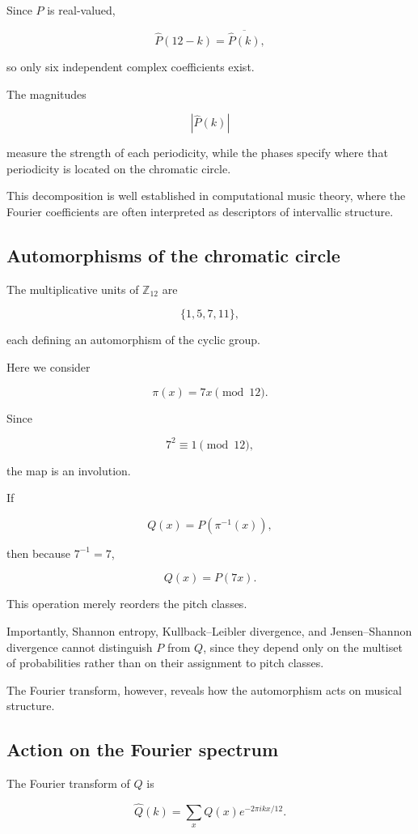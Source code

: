 \documentclass[twoside,onecolumn]{article}
\begin{document}
Since $P$ is real-valued,

\[
\widehat P(12-k)
=
\overline{\widehat P(k)},
\]

so only six independent complex coefficients exist.

The magnitudes

\[
|\widehat P(k)|
\]

measure the strength of each periodicity, while the phases specify where that periodicity is located on the chromatic circle.

This decomposition is well established in computational music theory, where the Fourier coefficients are often interpreted as descriptors of intervallic structure.

\subsection{Automorphisms of the chromatic circle}

The multiplicative units of $\mathbb Z_{12}$ are

\[
\{1,5,7,11\},
\]

each defining an automorphism of the cyclic group.

Here we consider

\[
\pi(x)=7x\pmod{12}.
\]

Since

\[
7^2\equiv1\pmod{12},
\]

the map is an involution.

If

\[
Q(x)=P(\pi^{-1}(x)),
\]

then because $7^{-1}=7$,

\[
Q(x)=P(7x).
\]

This operation merely reorders the pitch classes.

Importantly, Shannon entropy, Kullback--Leibler divergence, and Jensen--Shannon divergence cannot distinguish $P$ from $Q$, since they depend only on the multiset of probabilities rather than on their assignment to pitch classes.

The Fourier transform, however, reveals how the automorphism acts on musical structure.

\subsection{Action on the Fourier spectrum}

The Fourier transform of $Q$ is

\[
\widehat Q(k)
=
\sum_x
Q(x)
e^{-2\pi i kx/12}.
\]
\end{document}
